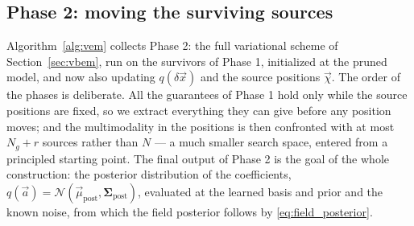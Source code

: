 \documentclass{article}
\begin{document}
\subsection{Phase 2: moving the surviving sources} \label{sec:algorithm}
Algorithm~\ref{alg:vem} collects Phase 2: the full variational scheme of Section~\ref{sec:vbem}, run on the survivors of Phase 1, initialized at the pruned model, and now also updating $q(\delta\vec x)$ and the source positions $\vec\chi$. The order of the phases is deliberate. All the guarantees of Phase 1 hold only while the source positions are fixed, so we extract everything they can give before any position moves; and the multimodality in the positions is then confronted with at most $N_g + r$ sources rather than $N$ --- a much smaller search space, entered from a principled starting point. The final output of Phase 2 is the goal of the whole construction: the posterior distribution of the coefficients, $q(\vec a) = \mathcal N(\vec\mu_{\text{post}}, \mathbf{\Sigma}_{\text{post}})$, evaluated at the learned basis and prior and the known noise, from which the field posterior follows by \eqref{eq:field_posterior}.
\end{document}
